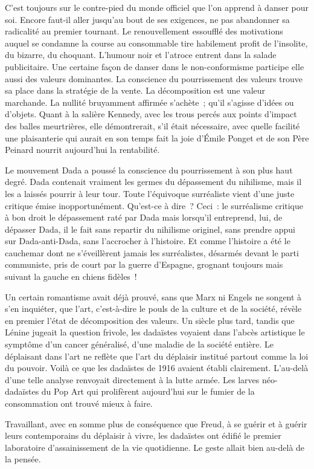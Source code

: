 \documentclass[french,twoside]{book} %
\newcommand{\astermono}{\medskip\centerline{\color{rubric}\large\selectfont{\syms ✻}}\medskip\par}%
\begin{document}
\astermono

\noindent C’est toujours sur le contre-pied du monde officiel que l’on apprend à danser pour soi. Encore faut-il aller jusqu’au bout de ses exigences, ne pas abandonner sa radicalité au premier tournant. Le renouvellement essoufflé des motivations auquel se condamne la course au consommable tire habilement profit de l’insolite, du bizarre, du choquant. L’humour noir et l’atroce entrent dans la salade publicitaire. Une certaine façon de danser dans le non-conformisme participe elle aussi des valeurs dominantes. La conscience du pourrissement des valeurs trouve sa place dans la stratégie de la vente. La décomposition est une valeur marchande. La nullité bruyamment affirmée s’achète ; qu’il s’agisse d’idées ou d’objets. Quant à la salière Kennedy, avec les trous percés aux points d’impact des balles meurtrières, elle démontrerait, s’il était nécessaire, avec quelle facilité une plaisanterie qui aurait en son temps fait la joie d’Émile Ponget et de son Père Peinard nourrit aujourd’hui la rentabilité.\par
Le mouvement Dada a poussé la conscience du pourrissement à son plus haut degré. Dada contenait vraiment les germes du dépassement du nihilisme, mais il les a laissés pourrir à leur tour. Toute l’équivoque surréaliste vient d’une juste critique émise inopportunément. Qu’est-ce à dire ? Ceci : le surréalisme critique à bon droit le dépassement raté par Dada mais lorsqu’il entreprend, lui, de dépasser Dada, il le fait sans repartir du nihilisme originel, sans prendre appui sur Dada-anti-Dada, sans l’accrocher à l’histoire. Et comme l’histoire a été le cauchemar dont ne s’éveillèrent jamais les surréalistes, désarmés devant le parti communiste, pris de court par la guerre d’Espagne, grognant toujours mais suivant la gauche en chiens fidèles !\par
Un certain romantisme avait déjà prouvé, sans que Marx ni Engels ne songent à s’en inquiéter, que l’art, c’est-à-dire le pouls de la culture et de la société, révèle en premier l’état de décomposition des valeurs. Un siècle plus tard, tandis que Lénine jugeait la question frivole, les dadaïstes voyaient dans l’abcès artistique le symptôme d’un cancer généralisé, d’une maladie de la société entière. Le déplaisant dans l’art ne reflète que l’art du déplaisir institué partout comme la loi du pouvoir. Voilà ce que les dadaïstes de 1916 avaient établi clairement. L’au-delà d’une telle analyse renvoyait directement à la lutte armée. Les larves néo-dadaïstes du Pop Art qui prolifèrent aujourd’hui sur le fumier de la consommation ont trouvé mieux à faire.\par
Travaillant, avec en somme plus de conséquence que Freud, à se guérir et à guérir leurs contemporains du déplaisir à vivre, les dadaïstes ont édifié le premier laboratoire d’assainissement de la vie quotidienne. Le geste allait bien au-delà de la pensée.\par
\end{document}
